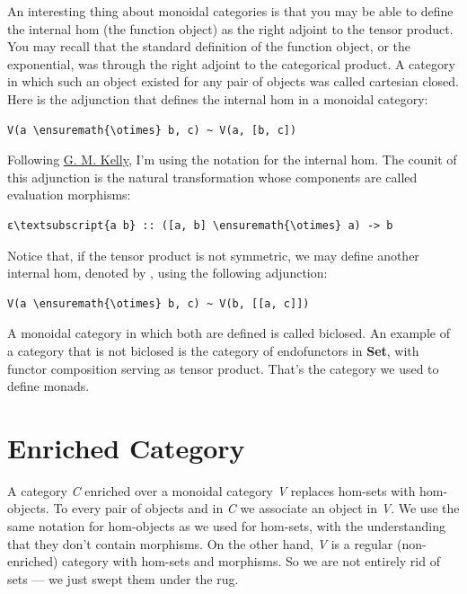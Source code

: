 An interesting thing about monoidal categories is that you may be able
to define the internal hom (the function object) as the right adjoint to
the tensor product. You may recall that the standard definition of the
function object, or the exponential, was through the right adjoint to
the categorical product. A category in which such an object existed for
any pair of objects was called cartesian closed. Here is the adjunction
that defines the internal hom in a monoidal category:

\begin{Verbatim}[commandchars=\\\{\}]
V(a \ensuremath{\otimes} b, c) ~ V(a, [b, c])
\end{Verbatim}
Following
\href{http://www.tac.mta.ca/tac/reprints/articles/10/tr10.pdf}{G. M.
Kelly}, I'm using the notation \code{{[}b, c{]}} for the internal
hom. The counit of this adjunction is the natural transformation whose
components are called evaluation morphisms:

\begin{Verbatim}[commandchars=\\\{\}]
ε\textsubscript{a b} :: ([a, b] \ensuremath{\otimes} a) -> b
\end{Verbatim}
Notice that, if the tensor product is not symmetric, we may define
another internal hom, denoted by \code{{[}{[}a, c{]}{]}}, using the
following adjunction:

\begin{Verbatim}[commandchars=\\\{\}]
V(a \ensuremath{\otimes} b, c) ~ V(b, [[a, c]])
\end{Verbatim}
A monoidal category in which both are defined is called biclosed. An
example of a category that is not biclosed is the category of
endofunctors in \textbf{Set}, with functor composition serving as tensor
product. That's the category we used to define monads.

\section{Enriched Category}\label{enriched-category}

A category \emph{C} enriched over a monoidal category \emph{V} replaces
hom-sets with hom-objects. To every pair of objects  and
 in \emph{C} we associate an object  in
\emph{V}. We use the same notation for hom-objects as we used for
hom-sets, with the understanding that they don't contain morphisms. On
the other hand, \emph{V} is a regular (non-enriched) category with
hom-sets and morphisms. So we are not entirely rid of sets --- we just
swept them under the rug.

